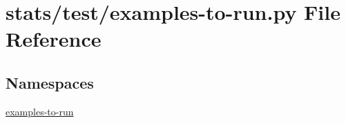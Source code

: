 \hypertarget{stats_2test_2examples-to-run_8py}{}\section{stats/test/examples-\/to-\/run.py File Reference}
\label{stats_2test_2examples-to-run_8py}
\subsection*{Namespaces}
\begin{DoxyCompactItemize}
\item 
 \hyperlink{namespaceexamples-to-run}{examples-\/to-\/run}
\end{DoxyCompactItemize}
